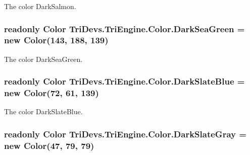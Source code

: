 The color Dark\-Salmon. 

\hypertarget{struct_tri_devs_1_1_tri_engine_1_1_color_ace9287f842fa7ca4ad3a1d3e8cf9c90e}{
\subsubsection[{Dark\-Sea\-Green}]{\setlength{\rightskip}{0pt plus 5cm}readonly {\bf Color} Tri\-Devs.\-Tri\-Engine.\-Color.\-Dark\-Sea\-Green = new {\bf Color}(143, 188, 139)\hspace{0.3cm}{\ttfamily [static]}}}\label{struct_tri_devs_1_1_tri_engine_1_1_color_ace9287f842fa7ca4ad3a1d3e8cf9c90e}


The color Dark\-Sea\-Green. 

\hypertarget{struct_tri_devs_1_1_tri_engine_1_1_color_a5ec06788b341277d308f4a5d5e7b7390}{
\subsubsection[{Dark\-Slate\-Blue}]{\setlength{\rightskip}{0pt plus 5cm}readonly {\bf Color} Tri\-Devs.\-Tri\-Engine.\-Color.\-Dark\-Slate\-Blue = new {\bf Color}(72, 61, 139)\hspace{0.3cm}{\ttfamily [static]}}}\label{struct_tri_devs_1_1_tri_engine_1_1_color_a5ec06788b341277d308f4a5d5e7b7390}


The color Dark\-Slate\-Blue. 

\hypertarget{struct_tri_devs_1_1_tri_engine_1_1_color_aeb2752a4c850993dd7af43c2513759b4}{
\subsubsection[{Dark\-Slate\-Gray}]{\setlength{\rightskip}{0pt plus 5cm}readonly {\bf Color} Tri\-Devs.\-Tri\-Engine.\-Color.\-Dark\-Slate\-Gray = new {\bf Color}(47, 79, 79)\hspace{0.3cm}{\ttfamily [static]}}}\label{struct_tri_devs_1_1_tri_engine_1_1_color_aeb2752a4c850993dd7af43c2513759b4}


